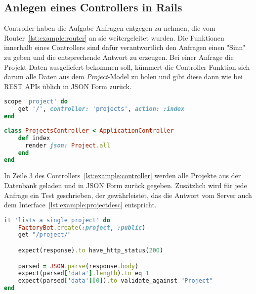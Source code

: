 \subsection{Anlegen eines Controllers in Rails}
\label{sec:requirements:example:controller}
Controller haben die Aufgabe Anfragen entgegen zu nehmen, die vom Router~\ref{lst:example:router} an sie weitergeleitet wurden.
Die Funktionen innerhalb eines Controllers sind dafür verantwortlich den Anfragen einen "Sinn" zu geben und die entsprechende Antwort zu erzeugen.
Bei einer Anfrage die Projekt-Daten ausgeliefert bekommen soll, kümmert die Controller Funktion sich darum alle Daten aus dem \emph{Project}-Model
zu holen und gibt diese dann wie bei REST APIs üblich in JSON Form zurück.

\begin{lstlisting}[language=Ruby,float=h!,caption={Route entspricht URL '/project/' und leitet Anfrage an die ProjectsController Funktion \emph{index} weiter }, label={lst:example:router}]
scope 'project' do
    get '/', controller: 'projects', action: :index
end
\end{lstlisting}

\begin{lstlisting}[language=Ruby,float=h!,caption={Controller mit Funktion zum zurückgeben aller Project Instanzen}, label={lst:example:controller}]
class ProjectsController < ApplicationController
    def index
      render json: Project.all
    end
end
\end{lstlisting}

In Zeile 3 des Controllers~\ref{lst:example:controller} werden alle Projekte aus der Datenbank geladen und in JSON Form
zurück gegeben. Zusätzlich wird für jede Anfrage ein Test geschrieben, der gewährleistet, das die Antwort vom Server auch dem
Interface~\ref{lst:example:projectdesc} entspricht.

\begin{lstlisting}[language=Ruby,float=h!,caption={Test überprüft, ob bei Anfrage der Route '/project/' eine Antwort vom Typ Project folgt}, label={lst:example:controller}]
it 'lists a single project' do
    FactoryBot.create(:project, :public)
    get "/project/"

    expect(response).to have_http_status(200)

    parsed = JSON.parse(response.body)
    expect(parsed['data'].length).to eq 1
    expect(parsed['data'][0]).to validate_against "Project"
end

\end{lstlisting}

